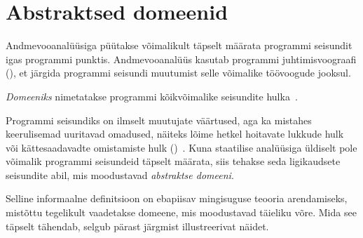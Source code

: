 \documentclass[../thesis.tex]{subfiles}
\begin{document}
\section{Abstraktsed domeenid}
Andmevooanalüüsiga püütakse võimalikult täpselt määrata programmi seisundit igas programmi punktis. Andmevooanalüüs kasutab programmi juhtimisvoograafi (), et järgida programmi seisundi muutumist selle võimalike töövoogude jooksul.

\begin{definition}
\emph{Domeeniks} nimetatakse programmi kõikvõimalike seisundite hulka~\cite{vojdani_magister}.
\end{definition}

Programmi seisundiks on ilmselt muutujate väärtused, aga ka mistahes keerulisemad uuritavad omadused, näiteks lõime hetkel hoitavate lukkude hulk~\cite{vojdani_magister} või kättesaadavadte omistamiste hulk ()~\cite[12]{seidl_foundations}. Kuna staatilise analüüsiga üldiselt pole võimalik programmi seisundeid täpselt määrata, siis tehakse seda ligikaudsete seisundite abil, mis moodustavad \emph{abstraktse domeeni}.

Selline informaalne definitsioon on ebapiisav mingisuguse teooria arendamiseks, mistõttu tegelikult vaadetakse domeene, mis moodustavad täieliku võre. Mida see täpselt tähendab, selgub pärast järgmist illustreerivat näidet.
\end{document}
